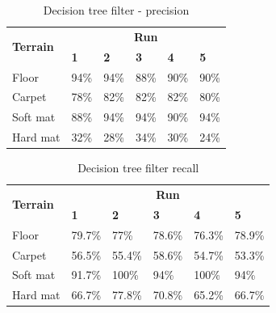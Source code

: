 \documentclass[USenglish]{ifimaster}  %
\begin{document}
	\begin{table}[h]
		\centering
		\begin{tabular}{@{}llllll@{}}
			\toprule
			\multirow{2}{*}{\textbf{Terrain}} & \multicolumn{5}{c}{\textbf{Run}} \\ \cmidrule(l){2-6} 
			& \multicolumn{1}{l|}{\textbf{1}} & \multicolumn{1}{l|}{\textbf{2}} & \multicolumn{1}{l|}{\textbf{3}} & \multicolumn{1}{l|}{\textbf{4}} & \textbf{5} \\ \midrule
			\multicolumn{1}{l|}{Floor} & \multicolumn{1}{l|}{94\%} & \multicolumn{1}{l|}{94\%} & \multicolumn{1}{l|}{88\%} & \multicolumn{1}{l|}{90\%} & 90\% \\ \midrule
			\multicolumn{1}{l|}{Carpet} & \multicolumn{1}{l|}{78\%} & \multicolumn{1}{l|}{82\%} & \multicolumn{1}{l|}{82\%} & \multicolumn{1}{l|}{82\%} & 80\% \\ \midrule
			\multicolumn{1}{l|}{Soft mat} & \multicolumn{1}{l|}{88\%} & \multicolumn{1}{l|}{94\%} & \multicolumn{1}{l|}{94\%} & \multicolumn{1}{l|}{90\%} & 94\% \\ \midrule
			\multicolumn{1}{l|}{Hard mat} & \multicolumn{1}{l|}{32\%} & \multicolumn{1}{l|}{28\%} & \multicolumn{1}{l|}{34\%} & \multicolumn{1}{l|}{30\%} & 24\% \\ \bottomrule
		\end{tabular}
		\caption{Decision tree filter - precision}
		\label{dtfilterprecision}
	\end{table}
	\FloatBarrier
	
	\begin{table}[h]
		\centering
		\begin{tabular}{@{}llllll@{}}
			\toprule
			\multirow{2}{*}{\textbf{Terrain}} & \multicolumn{5}{c}{\textbf{Run}} \\ \cmidrule(l){2-6} 
			& \multicolumn{1}{l|}{\textbf{1}} & \multicolumn{1}{l|}{\textbf{2}} & \multicolumn{1}{l|}{\textbf{3}} & \multicolumn{1}{l|}{\textbf{4}} & \textbf{5} \\ \midrule
			\multicolumn{1}{l|}{Floor} & \multicolumn{1}{l|}{79.7\%} & \multicolumn{1}{l|}{77\%} & \multicolumn{1}{l|}{78.6\%} & \multicolumn{1}{l|}{76.3\%} & 78.9\% \\ \midrule
			\multicolumn{1}{l|}{Carpet} & \multicolumn{1}{l|}{56.5\%} & \multicolumn{1}{l|}{55.4\%} & \multicolumn{1}{l|}{58.6\%} & \multicolumn{1}{l|}{54.7\%} & 53.3\% \\ \midrule
			\multicolumn{1}{l|}{Soft mat} & \multicolumn{1}{l|}{91.7\%} & \multicolumn{1}{l|}{100\%} & \multicolumn{1}{l|}{94\%} & \multicolumn{1}{l|}{100\%} & 94\% \\ \midrule
			\multicolumn{1}{l|}{Hard mat} & \multicolumn{1}{l|}{66.7\%} & \multicolumn{1}{l|}{77.8\%} & \multicolumn{1}{l|}{70.8\%} & \multicolumn{1}{l|}{65.2\%} & 66.7\% \\ \bottomrule
		\end{tabular}
		\caption{Decision tree filter recall}
		\label{dtfilterrecall}
	\end{table}
	\FloatBarrier
	
\end{document}
